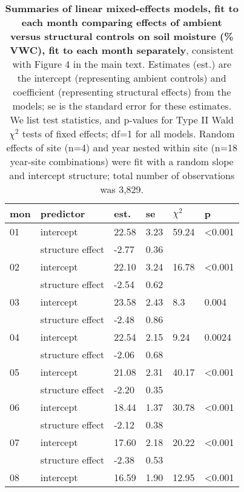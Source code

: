 \documentclass{article}
\begin{document}
\begin{table}[ht]
\centering
\caption{\textbf{Summaries of linear mixed-effects models, fit to each month comparing effects of ambient versus structural controls on soil moisture (\% VWC), fit to each month separately}, consistent with Figure 4 in the main text. Estimates (est.) are the intercept (representing ambient controls) and coefficient (representing structural effects) from the models; se is the standard error for these estimates. We list test statistics, and p-values for Type II Wald $\chi^{2}$ tests of fixed effects; df=1 for all models. Random effects of site (n=4) and year nested within site (n=18 year-site combinations) were fit with a random slope and intercept structure; total number of observations was 3,829.} 
\label{table:shamamb_soilmoism}
\begingroup\footnotesize
\begin{tabular}{|p{}|p{}|p{}p{}p{}p{}|}
  \hline
mon & predictor & est. & se & $\chi^2$ & p \\ 
  \hline
01 & intercept & 22.58 & 3.23 & 59.24 & <0.001 \\ 
    & structure effect & -2.77 & 0.36 &  &  \\ 
   \hline
02 & intercept & 22.10 & 3.24 & 16.78 & <0.001 \\ 
    & structure effect & -2.54 & 0.62 &  &  \\ 
   \hline
03 & intercept & 23.58 & 2.43 & 8.3 & 0.004 \\ 
    & structure effect & -2.48 & 0.86 &  &  \\ 
   \hline
04 & intercept & 22.54 & 2.15 & 9.24 & 0.0024 \\ 
    & structure effect & -2.06 & 0.68 &  &  \\ 
   \hline
05 & intercept & 21.08 & 2.31 & 40.17 & <0.001 \\ 
    & structure effect & -2.20 & 0.35 &  &  \\ 
   \hline
06 & intercept & 18.44 & 1.37 & 30.78 & <0.001 \\ 
    & structure effect & -2.12 & 0.38 &  &  \\ 
   \hline
07 & intercept & 17.60 & 2.18 & 20.22 & <0.001 \\ 
    & structure effect & -2.38 & 0.53 &  &  \\ 
   \hline
08 & intercept & 16.59 & 1.90 & 12.95 & <0.001 \\ 

\end{tabular}
\end{table}
\end{document}
